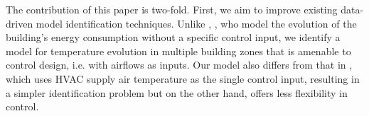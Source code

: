 
The contribution of this paper is two-fold. First, we aim to improve existing
data-driven model identification techniques. Unlike \cite{Radecki:2012aa}, \cite{Radecki:2013ab}, who model the evolution of the building's energy consumption without a specific control input, we identify a model for temperature evolution in multiple building zones that is amenable to control design, i.e. with airflows as inputs. Our model also differs from that in \cite{Aswani:2012aa}, which uses HVAC supply air temperature as the single control input, resulting in a simpler identification problem but on the other hand, offers less flexibility in control.

